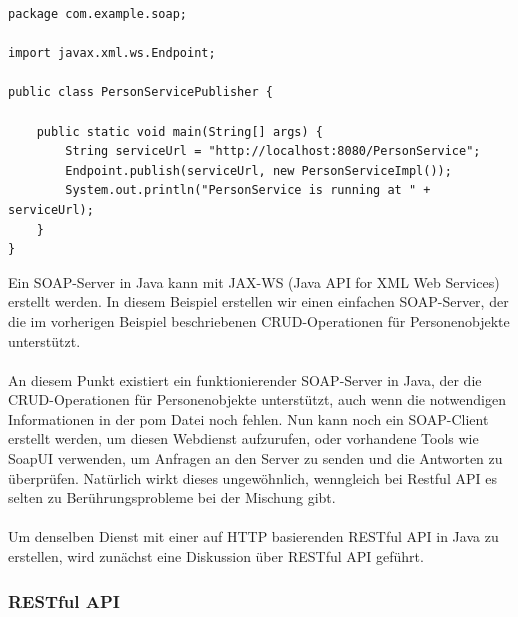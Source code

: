 \documentclass[../vs-script-first-v01.tex]{subfiles}
\begin{document}
\noindent\begin{minipage}{\textwidth}
\begin{lstlisting}[caption={SOAP Person Service Publisher},captionpos=b,label={lst:soap_person_publish}]
package com.example.soap;

import javax.xml.ws.Endpoint;

public class PersonServicePublisher {

    public static void main(String[] args) {
        String serviceUrl = "http://localhost:8080/PersonService";
        Endpoint.publish(serviceUrl, new PersonServiceImpl());
        System.out.println("PersonService is running at " + serviceUrl);
    }
}
\end{lstlisting}
\end{minipage}
Ein SOAP-Server in Java kann mit JAX-WS (Java API for XML Web Services) erstellt werden. In diesem Beispiel erstellen wir einen einfachen SOAP-Server, der die im vorherigen Beispiel beschriebenen CRUD-Operationen für Personenobjekte unterstützt.\\\\
An diesem Punkt existiert ein funktionierender SOAP-Server in Java, der die CRUD-Operationen für Personenobjekte unterstützt, auch wenn die notwendigen Informationen in der pom Datei noch fehlen. Nun kann noch ein SOAP-Client erstellt werden, um diesen Webdienst aufzurufen, oder vorhandene Tools wie SoapUI verwenden, um Anfragen an den Server zu senden und die Antworten zu überprüfen. Natürlich wirkt dieses ungewöhnlich, wenngleich bei Restful API es selten zu Berührungsprobleme bei der Mischung gibt. 
\\\\
Um denselben Dienst mit einer auf HTTP basierenden RESTful API in Java zu erstellen, wird zunächst eine Diskussion über RESTful API geführt. 

\subsubsection{RESTful API}
\end{document}
